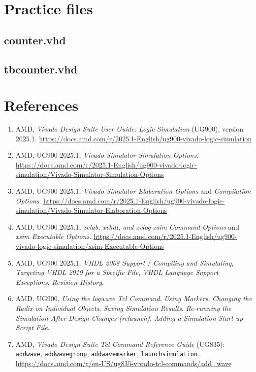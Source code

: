 \documentclass[11pt,a4paper]{article}
\newcommand{\code}[1]{\texttt{#1}}
\renewcommand{\_}{\oldunderscore\allowbreak{}}
\begin{document}
\appendix
\section{Practice files}\label{app:practice}
\subsection*{counter.vhd}

\subsection*{tb\_counter.vhd}


\section*{References}
\begin{enumerate}[nosep]
  \item AMD, \emph{Vivado Design Suite User Guide: Logic Simulation} (UG900), version 2025.1. \url{https://docs.amd.com/r/2025.1-English/ug900-vivado-logic-simulation}
  \item AMD, UG900 2025.1, \emph{Vivado Simulator Simulation Options}. \url{https://docs.amd.com/r/2025.1-English/ug900-vivado-logic-simulation/Vivado-Simulator-Simulation-Options}
  \item AMD, UG900 2025.1, \emph{Vivado Simulator Elaboration Options} and \emph{Compilation Options}. \url{https://docs.amd.com/r/2025.1-English/ug900-vivado-logic-simulation/Vivado-Simulator-Elaboration-Options}
  \item AMD, UG900 2025.1, \emph{xelab, xvhdl, and xvlog xsim Command Options} and \emph{xsim Executable Options}. \url{https://docs.amd.com/r/2025.1-English/ug900-vivado-logic-simulation/xsim-Executable-Options}
  \item AMD, UG900 2025.1, \emph{VHDL 2008 Support} / \emph{Compiling and Simulating}, \emph{Targeting VHDL 2019 for a Specific File}, \emph{VHDL Language Support Exceptions}, \emph{Revision History}.
  \item AMD, UG900, \emph{Using the log\_wave Tcl Command}, \emph{Using Markers}, \emph{Changing the Radix on Individual Objects}, \emph{Saving Simulation Results}, \emph{Re-running the Simulation After Design Changes (relaunch)}, \emph{Adding a Simulation Start-up Script File}.
  \item AMD, \emph{Vivado Design Suite Tcl Command Reference Guide} (UG835): \code{add\_wave}, \code{add\_wave\_group}, \code{add\_wave\_marker}, \code{launch\_simulation}. \url{https://docs.amd.com/r/en-US/ug835-vivado-tcl-commands/add_wave}
\end{enumerate}
\end{document}
